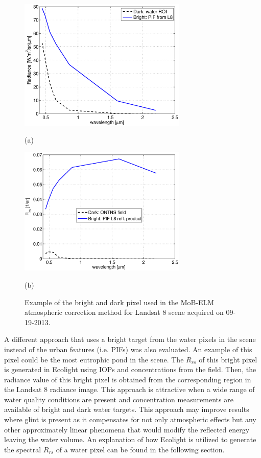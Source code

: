 \documentclass[onecolumn,3p,letterpaper]{elsarticle}
\begin{document}
\begin{figure}[htb]
  \begin{minipage}[c]{0.48\linewidth}
    \centering
      \includegraphics[width=8cm]{./Images/ELMrad130929_150422.eps}
    \centerline{(a)}\medskip
  \end{minipage}
  \hfill
  \begin{minipage}[d]{0.48\linewidth}
    \centering
      \includegraphics[width=8cm]{./Images/ELMRrs130929_150422.eps}
    \centerline{(b)}\medskip
  \end{minipage}
  \caption{Example of the bright and dark pixel used in the MoB-ELM atmospheric correction method for Landsat 8 scene acquired on 09-19-2013.\label{fig:MOBELMpxls} } 
\end{figure}

A different approach that uses a bright target from the water pixels in the scene instead of the urban features (i.e. PIFs) was also evaluated. An example of this pixel could be the most eutrophic pond in the scene. The $R_{rs}$ of this bright pixel is generated in Ecolight using IOPs and concentrations from the field. Then, the radiance value of this bright pixel is obtained from the corresponding region in the Landsat 8 radiance image. This approach is attractive when a wide range of water quality conditions are present and concentration measurements are available of bright and dark water targets. This approach may improve results where glint is present as it compensates for not only atmospheric effects but any other approximately linear phenomena that would modify the reflected energy leaving the water volume. An explanation of how Ecolight is utilized to generate the spectral $R_{rs}$ of a water pixel can be found in the following section.
\end{document}
